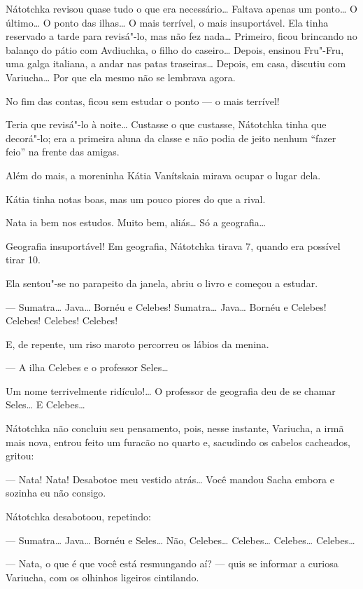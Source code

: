 Nátotchka revisou quase tudo o que era necessário\ldots{} Faltava apenas um
ponto\ldots{} O último\ldots{} O ponto das ilhas\ldots{} O mais terrível, o mais
insuportável. Ela tinha reservado a tarde para revisá"-lo, mas não fez
nada\ldots{} Primeiro, ficou brincando no balanço do pátio com Avdiuchka, o
filho do caseiro\ldots{} Depois, ensinou Fru"-Fru, uma galga italiana, a andar
nas patas traseiras\ldots{} Depois, em casa, discutiu com Variucha\ldots{}
Por que ela mesmo não se lembrava agora.

No fim das contas, ficou sem estudar o ponto --- o mais terrível!

Teria que revisá"-lo à noite\ldots{} Custasse o que custasse, Nátotchka tinha
que decorá"-lo; era a primeira aluna da classe e não podia de jeito
nenhum ``fazer feio'' na frente das amigas.

Além do mais, a moreninha Kátia Vanítskaia mirava ocupar o lugar dela.

Kátia tinha notas boas, mas um pouco piores do que a rival.

Nata ia bem nos estudos. Muito bem, aliás\ldots{} Só a geografia\ldots{}

Geografia insuportável! Em geografia, Nátotchka tirava 7, quando era
possível tirar 10.

Ela sentou"-se no parapeito da janela, abriu o livro e começou a estudar.

--- Sumatra\ldots{} Java\ldots{} Bornéu e Celebes! Sumatra\ldots{} Java\ldots{} Bornéu e
Celebes! Celebes! Celebes! Celebes!

E, de repente, um riso maroto percorreu os lábios da menina.

--- A ilha Celebes e o professor Seles\ldots{}

Um nome terrivelmente ridículo!\ldots{} O professor de geografia deu de se
chamar Seles\ldots{} E Celebes\ldots{}

Nátotchka não concluiu seu pensamento, pois, nesse instante, Variucha, a
irmã mais nova, entrou feito um furacão no quarto e, sacudindo os
cabelos cacheados, gritou:

--- Nata! Nata! Desabotoe meu vestido atrás\ldots{} Você mandou Sacha embora
e sozinha eu não consigo.

Nátotchka desabotoou, repetindo:

--- Sumatra\ldots{} Java\ldots{} Bornéu e Seles\ldots{} Não, Celebes\ldots{} Celebes\ldots{}
Celebes\ldots{} Celebes\ldots{}

--- Nata, o que é que você está resmungando aí? --- quis se informar a
curiosa Variucha, com os olhinhos ligeiros cintilando.

